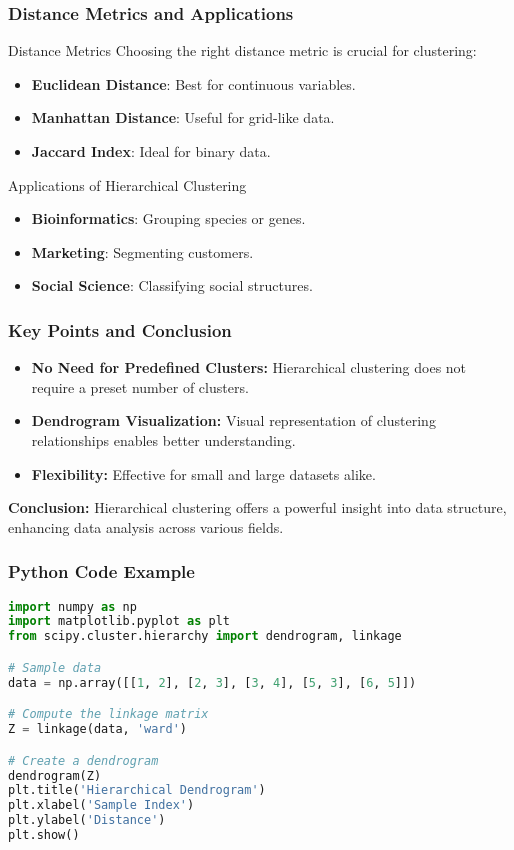 \documentclass[aspectratio=169]{beamer}
\begin{document}
\begin{frame}[fragile]
    \frametitle{Distance Metrics and Applications}
    \begin{block}{Distance Metrics}
        Choosing the right distance metric is crucial for clustering:
        \begin{itemize}
            \item \textbf{Euclidean Distance}: Best for continuous variables.
            \item \textbf{Manhattan Distance}: Useful for grid-like data.
            \item \textbf{Jaccard Index}: Ideal for binary data.
        \end{itemize}
    \end{block}

    \begin{block}{Applications of Hierarchical Clustering}
        \begin{itemize}
            \item \textbf{Bioinformatics}: Grouping species or genes.
            \item \textbf{Marketing}: Segmenting customers.
            \item \textbf{Social Science}: Classifying social structures.
        \end{itemize}
    \end{block}
\end{frame}

\begin{frame}[fragile]
    \frametitle{Key Points and Conclusion}
    \begin{itemize}
        \item \textbf{No Need for Predefined Clusters:} Hierarchical clustering does not require a preset number of clusters.
        \item \textbf{Dendrogram Visualization:} Visual representation of clustering relationships enables better understanding.
        \item \textbf{Flexibility:} Effective for small and large datasets alike.
    \end{itemize}

    \textbf{Conclusion:} Hierarchical clustering offers a powerful insight into data structure, enhancing data analysis across various fields.
\end{frame}

\begin{frame}[fragile]
    \frametitle{Python Code Example}
    \begin{lstlisting}[language=Python]
import numpy as np
import matplotlib.pyplot as plt
from scipy.cluster.hierarchy import dendrogram, linkage

# Sample data
data = np.array([[1, 2], [2, 3], [3, 4], [5, 3], [6, 5]])

# Compute the linkage matrix
Z = linkage(data, 'ward')

# Create a dendrogram
dendrogram(Z)
plt.title('Hierarchical Dendrogram')
plt.xlabel('Sample Index')
plt.ylabel('Distance')
plt.show()
    \end{lstlisting}
\end{frame}
\end{document}
